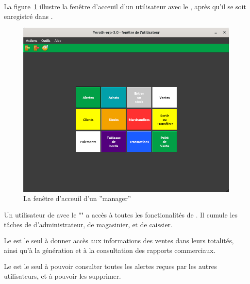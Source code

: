 \label{sec:utilisateurs-lepatron}

La figure~\ref{fig:yeren-fenetre-patron} illustre la fen\^etre
d'acceuil d'un utilisateur avec le \role \manager, 
apr\`es qu'il se soit enregistr\'e dans \yeren.\\

\begin{figure}[!htbp]
\centering
\includegraphics[scale=0.63]{images/yeroth-fenetre-manager.png}
\caption{La fen\^etre d'acceuil d'un ''manager''}
\label{fig:yeren-fenetre-patron}
\end{figure}

Un utilisateur de \yeren avec le \role "\manager" a
acc\`es \`a toutes les fonctionalit\'es de \yeren. Il
cumule les t\^aches de d'administrateur, de magasinier,
et de caissier.

Le \role \manager est le seul \`a donner acc\`es aux
informations des ventes dans leurs totalit\'es, ainsi
qu'\`a la g\'en\'eration et \`a la consultation des
rapports commerciaux.

Le \role \manager est le seul \`a pouvoir consulter toutes
les alertes re\c{c}ues par les autres utilisateurs, et
\`a pouvoir les supprimer.
